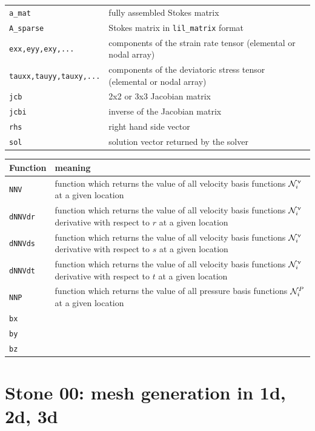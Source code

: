 \documentclass[a4paper,11pt]{report}
\begin{document}
\begin{tabular}{p{3.5cm}p{12.5cm}}
{\tt a\_mat}  & fully assembled Stokes matrix \\
{\tt A\_sparse} & Stokes matrix in {\tt lil\_matrix} format \\
{\tt exx,eyy,exy,...} & components of the strain rate tensor (elemental or nodal array)\\
{\tt tauxx,tauyy,tauxy,...} & components of the deviatoric stress tensor (elemental or nodal array)\\
{\tt jcb} & 2x2 or 3x3 Jacobian matrix \\
{\tt jcbi} & inverse of the Jacobian matrix \\
{\tt rhs} & right hand side vector \\
{\tt sol} & solution vector returned by the solver\\
\hline
\end{tabular}

\vspace{.5cm}

\begin{tabular}{p{2cm}p{14cm}}
\hline
Function & meaning \\
\hline
{\tt NNV}    & function which returns the value of all velocity basis functions 
               ${\cal N}_i^\upnu$ at a given location\\
{\tt dNNVdr} & function which returns the value of all velocity basis functions 
               ${\cal N}_i^\upnu$ derivative with respect to $r$ at a given location\\
{\tt dNNVds} & function which returns the value of all velocity basis functions 
               ${\cal N}_i^\upnu$ derivative with respect to $s$ at a given location\\
{\tt dNNVdt} & function which returns the value of all velocity basis functions 
               ${\cal N}_i^\upnu$ derivative with respect to $t$ at a given location\\
{\tt NNP}    & function which returns the value of all pressure basis functions 
               ${\cal N}_i^P$ at a given location\\
{\tt bx} & \\
{\tt by} & \\
{\tt bz} & \\
\hline
\end{tabular}



\chapter*{Stone 00: mesh generation in 1d, 2d, 3d \label{f00}} %
\end{document}
